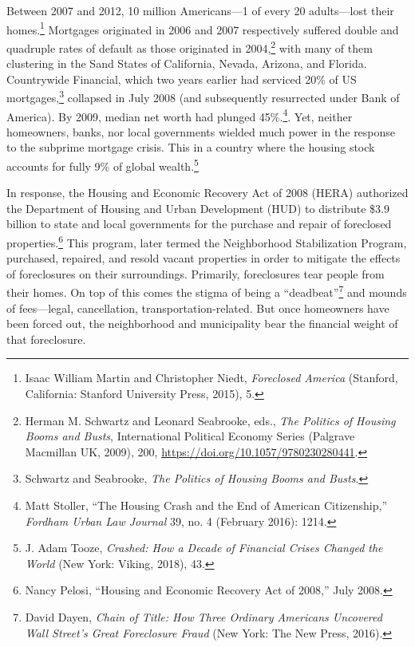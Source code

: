 \documentclass[12pt,oneside]{psthesis}
\begin{document}
Between 2007 and 2012, 10 million Americans---1 of every 20 adults---lost their homes.\footnote{Isaac William Martin and Christopher Niedt, \emph{Foreclosed America} (Stanford, California: Stanford University Press, 2015), 5.}
Mortgages originated in 2006 and 2007 respectively suffered double and quadruple rates of default as those originated in 2004,\footnote{Herman M. Schwartz and Leonard Seabrooke, eds., \emph{The Politics of Housing Booms and Busts}, International Political Economy Series (Palgrave Macmillan UK, 2009), 200, \url{https://doi.org/10.1057/9780230280441}.} with many of them clustering in the Sand States of California, Nevada, Arizona, and Florida.
Countrywide Financial, which two years earlier had serviced 20\% of US mortgages,\footnote{Schwartz and Seabrooke, \emph{The Politics of Housing Booms and Busts}.} collapsed in July 2008 (and subsequently resurrected under Bank of America).
By 2009, median net worth had plunged 45\%.\footnote{Matt Stoller, ``The Housing Crash and the End of American Citizenship,'' \emph{Fordham Urban Law Journal} 39, no. 4 (February 2016): 1214.}.
Yet, neither homeowners, banks, nor local governments wielded much power in the response to the subprime mortgage crisis.
This in a country where the housing stock accounts for fully 9\% of global wealth.\footnote{J. Adam Tooze, \emph{Crashed: How a Decade of Financial Crises Changed the World} (New York: Viking, 2018), 43.}

In response, the Housing and Economic Recovery Act of 2008 (HERA) authorized the Department of Housing and Urban Development (HUD) to distribute \$3.9 billion to state and local governments for the purchase and repair of foreclosed properties.\footnote{Nancy Pelosi, ``Housing and Economic Recovery Act of 2008,'' July 2008.}
This program, later termed the Neighborhood Stabilization Program, purchased, repaired, and resold vacant properties in order to mitigate the effects of foreclosures on their surroundings.
Primarily, foreclosures tear people from their homes.
On top of this comes the stigma of being a ``deadbeat''\footnote{David Dayen, \emph{Chain of Title: How Three Ordinary Americans Uncovered Wall Street's Great Foreclosure Fraud} (New York: The New Press, 2016).} and mounds of fees---legal, cancellation, transportation-related.
But once homeowners have been forced out, the neighborhood and municipality bear the financial weight of that foreclosure.
\end{document}
